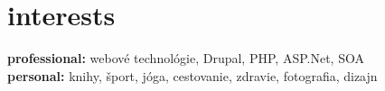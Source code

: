 \documentclass[]{friggeri-cv} %
\begin{document}




\section{interests}

\textbf{professional:} webové technológie, Drupal, PHP, ASP.Net, SOA \\
\textbf{personal:} knihy, šport, jóga, cestovanie, zdravie, fotografia, dizajn

\end{document}
